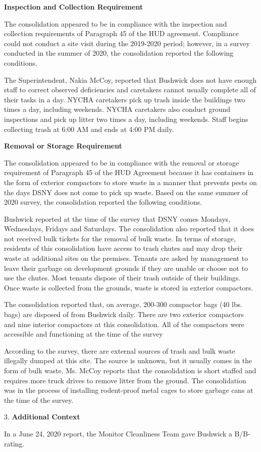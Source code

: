

\textbf{Inspection and Collection Requirement}

The consolidation appeared to be in compliance with the inspection and collection requirements of Paragraph 45 of the HUD agreement. Compliance could not conduct a site visit during the 2019-2020 period; however, in a survey conducted in the summer of 2020, the consolidation reported the following conditions.

The Superintendent, Nakia McCoy, reported that Bushwick does not have enough staff to correct observed deficiencies and caretakers cannot usually complete all of their tasks in a day. NYCHA caretakers pick up trash inside the buildings two times a day, including weekends. NYCHA caretakers also conduct ground inspections and pick up litter two times a day, including weekends. Staff begins collecting trash at 6:00 AM and ends at  4:00 PM daily. 

\textbf{Removal or Storage Requirement}

The consolidation appeared to be in compliance with the  removal or storage requirement of Paragraph  45 of the HUD Agreement because it has containers in the form of exterior compactors to store waste in a manner that prevents pests on the days DSNY does not come to pick up waste. Based on the same summer of  2020 survey, the consolidation reported the following conditions.

Bushwick reported at the time of the survey that DSNY comes Mondays, Wednesdays, Fridays and Saturdays. The consolidation also reported that it does not received bulk tickets for the removal of bulk waste. In terms of storage, residents of this consolidation have access to trash chutes and may drop their waste at additional sites on the premises. Tenants are  asked by management to leave their garbage on development grounds if they are unable or choose not to use the chutes. Most tenants dispose of their trash outside of their buildings. Once waste is collected from the grounds, waste is stored in exterior compactors. 

The consolidation reported that, on average, 200-300 compactor bags (40 lbs. bags)  are disposed of from Bushwick daily. There are two exterior compactors and nine interior compactors at this consolidation. All of the compactors were accessible and functioning at the time of the survey

According to the survey, there are external sources of trash and bulk waste illegally dumped at this site. The source is unknown, but it usually comes in the form of bulk waste. Ms. McCoy reports that the consolidation is short staffed and requires more truck drives to remove litter from the ground. The consolidation was in the process of installing rodent-proof metal cages to store garbage cans at the time of the survey.

3. \textbf{Additional Context} 

In a June 24, 2020 report, the Monitor Cleanliness Team gave Bushwick a B/B- rating. 